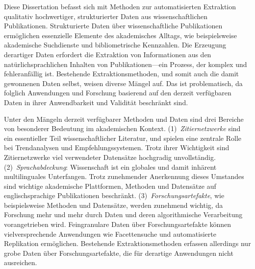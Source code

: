 \Abstract[Zusammenfassung]{}
Diese Dissertation befasst sich mit Methoden zur automatisierten Extraktion qualitativ hochwertiger, strukturierter Daten aus wissenschaftlichen Publikationen.
Strukturierte Daten über wissenschaftliche Publikationen ermöglichen essenzielle Elemente des akademisches Alltags, wie beispielsweise akademische Suchdienste und bibliometrische Kennzahlen.
Die Erzeugung derartiger Daten erfordert die Extraktion von Informationen aus den natürlichsprachlichen Inhalten von Publikationen---ein Prozess, der komplex und fehleranfällig ist.
Bestehende Extraktionsmethoden, und somit auch die damit gewonnenen Daten selbst, weisen diverse Mängel auf. Das ist problematisch, da folglich Anwendungen und Forschung basierend auf den derzeit verfügbaren Daten in ihrer Anwendbarkeit und Validität beschränkt sind.

Unter den Mängeln derzeit verfügbarer Methoden und Daten sind drei Bereiche von besonderer Bedeutung im akademischen Kontext.
(1)~\emph{Zitiernetzwerke} sind ein essentieller Teil wissenschaftlicher Literatur, und spielen eine zentrale Rolle bei Trendanalysen und Empfehlungssystemen. Trotz ihrer Wichtigkeit sind Zitiernetzwerke viel verwendeter Datensätze hochgradig unvollständig.
(2)~\emph{Sprachabdeckung}: Wissenschaft ist ein globales und damit inhärent multilinguales Unterfangen. Trotz zunehmender Anerkennung dieses Umstandes sind wichtige akademische Plattformen, Methoden und Datensätze auf englischsprachige Publikationen beschränkt.
(3)~\emph{Forschungsartefakte}, wie beispielsweise Methoden und Datensätze, werden zunehmend wichtig, da Forschung mehr und mehr durch Daten und deren algorithmische Verarbeitung vorangetrieben wird. Feingranulare Daten über Forschungsartefakte können vielversprechende Anwendungen wie Facettensuche und automatisierte Replikation ermöglichen. Bestehende Extraktionsmethoden erfassen allerdings nur grobe Daten über Forschungsartefakte, die für derartige Anwendungen nicht ausreichen.

